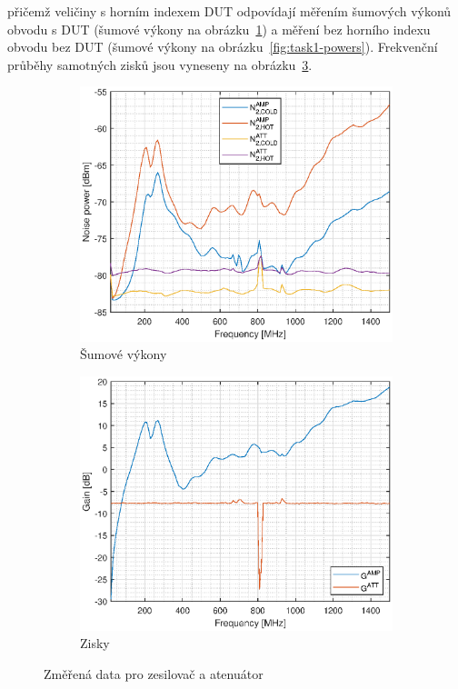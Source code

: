 \documentclass[11pt,a4paper]{article}
\begin{document}
přičemž veličiny s horním indexem $\mathrm{DUT}$ odpovídají měřením šumových výkonů obvodu s DUT (šumové výkony na obrázku~\ref{fig:task2-powers}) a měření bez horního indexu obvodu bez DUT (šumové výkony na obrázku~\ref{fig:task1-powers}). Frekvenční průběhy samotných zisků jsou vyneseny na obrázku~\ref{fig:task2-gains}.
\begin{figure}[!ht]
    \centering
    \begin{subfigure}{.45\textwidth}
        \centering
        \includegraphics[width=\textwidth]{src/task2-powers.eps}
        \caption{Šumové výkony}
        \label{fig:task2-powers}
    \end{subfigure}
    \begin{subfigure}{.45\textwidth}
        \centering
        \includegraphics[width=\textwidth]{src/task2-gains.eps}
        \caption{Zisky}
        \label{fig:task2-gains}
    \end{subfigure}
    \caption{Změřená data pro zesilovač a atenuátor}
\end{figure}
\end{document}
